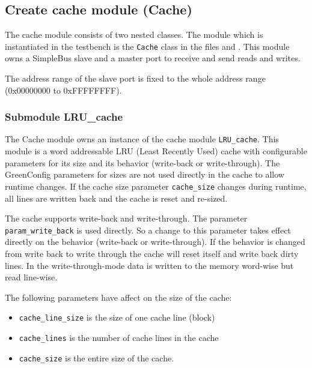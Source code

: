 \subsection{Create cache module (Cache)}
\label{Cache}

The cache module consists of two nested classes. The module which is instantiated in the testbench is the \lstinline|Cache| class in the files  and . This module owns a SimpleBus slave and a master port to receive and send reads and writes.

The address range of the slave port is fixed to the whole address range (0x00000000 to 0xFFFFFFFF).

\subsubsection{Submodule LRU\_cache}

The Cache module owns an instance of the cache module \lstinline|LRU_cache|. This module is a word addressable LRU (Least Recently Used) cache with configurable parameters for its size and its behavior (write-back or write-through).
The GreenConfig parameters for sizes are not used directly in the cache to allow runtime changes. If the cache size parameter \lstinline|cache_size| changes during runtime, all lines are written back and the cache is reset and re-sized. 
 
The cache supports write-back and write-through. The parameter
\lstinline|param_write_back| is used directly. So a change to this
parameter takes effect directly on the behavior (write-back or
write-through). If the behavior is changed from write back to write
through the cache will reset itself and write back dirty lines. In the
write-through-mode data is written to the memory word-wise but read
line-wise.

The following parameters have affect on the size of the cache:
\begin{itemize}
	\item \lstinline|cache_line_size| is the size of one cache line (block)
	\item \lstinline|cache_lines| is the number of cache lines in the cache
	\item \lstinline|cache_size| is the entire size of the cache.
\end{itemize}

